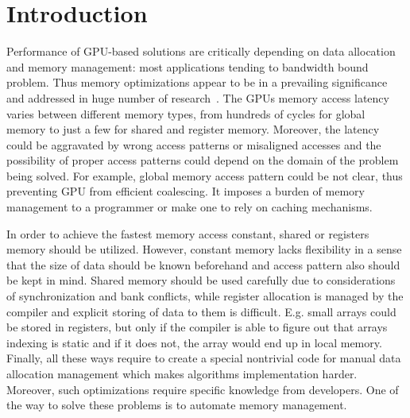 \documentclass[sigplan,review,anonymous]{acmart}\settopmatter{printfolios=true,printccs=false,printacmref=false}
\begin{document}
\maketitle


\section{Introduction}

Performance of GPU-based solutions are critically depending on data allocation and memory management: most applications tending to bandwidth bound problem.
Thus memory optimizations appear to be in a prevailing significance and addressed in huge number of research~\cite{Sakdhnagool2019RegDemIG, Xie2018ICCADU, zhang2019efficient}.
The GPUs memory access latency varies between different memory types, from hundreds of cycles for global memory to just a few for shared and register memory.
Moreover, the latency could be aggravated by wrong access patterns or misaligned accesses and the possibility of proper access patterns could depend on the domain of the problem being solved.
For example, global memory access pattern could be not clear, thus preventing GPU from efficient coalescing. 
It imposes a burden of memory management to a programmer or make one to rely on caching mechanisms. 

In order to achieve the fastest memory access constant, shared or registers memory should be utilized.
However, constant memory lacks flexibility in a sense that the size of data should be known beforehand and access pattern also should be kept in mind.
Shared memory should be used carefully due to considerations of synchronization and bank conflicts, while register allocation is managed by the compiler and explicit storing of data to them is difficult.
E.g. small arrays could be stored in registers, but only if the compiler is able to figure out that arrays indexing is static and if it does not, the array would end up in local memory.
Finally, all these ways require to create a special nontrivial code for manual data allocation management which makes algorithms implementation harder.
Moreover, such optimizations require specific knowledge from developers.
One of the way to solve these problems is to automate memory management.
\end{document}
